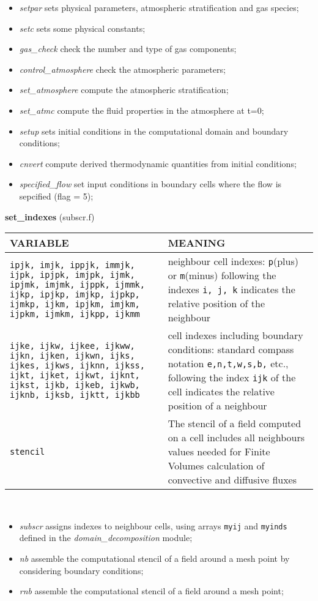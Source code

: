 \begin{itemize}
\item {\em setpar} sets physical parameters, atmospheric stratification and gas species;
\item {\em setc} sets some physical constants;
\item {\em gas\_check} check the number and type of gas components;
\item {\em control\_atmosphere} check the atmospheric parameters;
\item {\em set\_atmosphere} compute the atmospheric stratification;
\item {\em set\_atmc} compute the fluid properties in the atmosphere at t=0;
\item {\em setup} sets initial conditions in the computational domain and boundary conditions;
\item {\em cnvert} compute derived thermodynamic quantities from initial conditions;
\item {\em specified\_flow} set input conditions in  boundary cells where the flow is sepcified (flag = 5);
\end{itemize}
%
%
{\large{\bf set\_indexes}} (subscr.f)\\[5mm]
\begin{tabular}{|p{6cm}|p{6cm}|}\hline
VARIABLE & MEANING \\ \hline
\tt ipjk, imjk, ippjk, immjk, ijpk, ipjpk, imjpk, ijmk, ipjmk, imjmk, ijppk, ijmmk, ijkp, ipjkp, imjkp, ijpkp, ijmkp, ijkm, ipjkm, imjkm, ijpkm, ijmkm, ijkpp, ijkmm & neighbour cell indexes: {\tt p}(plus) or {\tt m}(minus) following the indexes {\tt i, j, k} indicates the relative position of the neighbour\\\hline
\tt ijke, ijkw, ijkee, ijkww, ijkn, ijken, ijkwn, ijks, ijkes, ijkws, ijknn, ijkss, ijkt, ijket, ijkwt, ijknt, ijkst, ijkb, ijkeb, ijkwb, ijknb, ijksb, ijktt, ijkbb & cell indexes including boundary conditions: standard compass notation {\tt e,n,t,w,s,b,} etc., following the index {\tt ijk} of the cell indicates the relative position of a neighbour \\\hline
\tt stencil & The stencil of a field computed on a cell includes all neighbours values needed for Finite Volumes calculation of convective and diffusive fluxes \\\hline
\end{tabular}\\
\begin{itemize}
\item{\em subscr} assigns indexes to neighbour cells, using arrays {\tt myij} and {\tt myinds} defined in the {\em domain\_decomposition} module;
\item{\em nb} assemble the computational stencil of a field around a mesh point by considering boundary conditions;
\item{\em rnb} assemble the computational stencil of a field around a mesh point;
\end{itemize}

